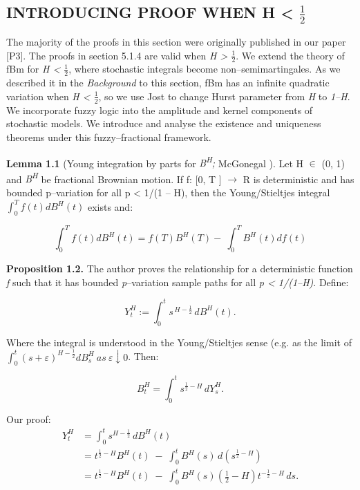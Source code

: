 \documentclass[12pt,a4paper]{report}
\numberwithin{equation}{section}
\begin{document}
\hypertarget{proof-h-lt-half}{%
\subsection{\texorpdfstring{INTRODUCING PROOF WHEN H \textless{} $\frac{1}{2}$
}{INTRODUCING PROOF WHEN H < 1/2}}\label{proof-h-lt-half}}

The majority of the proofs in this section were originally published in
our paper [P3]. The proofs in section 5.1.4 are valid when \emph{H
\textgreater{} $\frac{1}{2}$}. We extend the theory of fBm for \emph{H \textless{}
$\frac{1}{2}$}, where stochastic integrals become non--semimartingales. As we
described it in the \emph{Background} to this section, fBm has an
infinite quadratic variation when \emph{H \textless{} $\frac{1}{2}$}, so we use Jost
\cite{jost2006transformation_108} to change Hurst parameter from \emph{H} to \emph{1--H}. We
incorporate fuzzy logic into the amplitude and kernel components of
stochastic models. We introduce and analyse the existence and uniqueness
theorems under this fuzzy--fractional framework.

\textbf{Lemma 1.1} (Young integration by parts for
\emph{B\textsuperscript{H};} McGonegal \cite{mcgonegal2014fractional_109}). Let H $\in$ (0, 1) and
\emph{B\textsuperscript{H}} be fractional Brownian motion. If f: {[}0, T
{]} $\rightarrow$ R is deterministic and has bounded p--variation for all p
\textless{} 1/(1 -- H), then the Young/Stieltjes integral
\(\int_{0}^{T}{f(t)dB^{H}(t)}\) exists and:

\[\int_{0}^{T}{f(t)dB^{H}(t) = f(T)B^{H}(T) - \ \int_{0}^{T}{B^{H}(t)df(t)}}\]

\textbf{Proposition 1.2.} The author proves the relationship for a
deterministic function \emph{f} such that it has bounded
\emph{p}--variation sample paths for all \emph{p \textless{} 1/(1--H)}.
Define:

\[
Y_t^{H} := \int_{0}^{t} s^{\,H-\frac{1}{2}}\, dB^{H}(t).
\]


Where the integral is understood in the Young/Stieltjes sense (e.g. as
the limit of
\(\int_{0}^{t}{{(s + \varepsilon)}^{H - \frac{1}{2}}dB_{s}^{H}\ as\ \varepsilon \downarrow 0}\).
Then:

\[
B_{t}^{H}=\int_{0}^{t} s^{\frac{1}{2}-H}\, dY_{s}^{H}.
\]


Our proof:
\[
\begin{aligned}
Y_{t}^{H}
&= \int_{0}^{t} s^{H-\frac{1}{2}}\,dB^{H}(t) \\
&= t^{\frac{1}{2}-H}B^{H}(t)\;-\;\int_{0}^{t} B^{H}(s)\,d\!\left(s^{\frac{1}{2}-H}\right) \\
&= t^{\frac{1}{2}-H}B^{H}(t)\;-\;\int_{0}^{t} B^{H}(s)\left(\frac{1}{2}-H\right)t^{-\frac{1}{2}-H}\,ds .
\end{aligned}
\]
\end{document}
